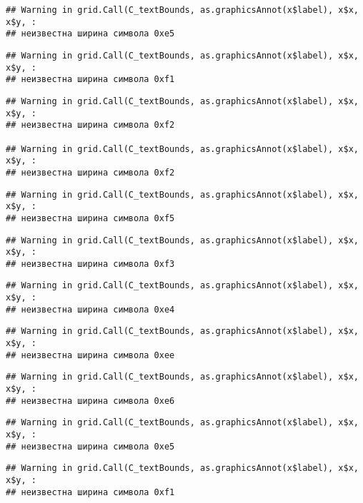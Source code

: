 \documentclass[
]{article}
\begin{document}
\begin{verbatim}
## Warning in grid.Call(C_textBounds, as.graphicsAnnot(x$label), x$x, x$y, :
## неизвестна ширина символа 0xe5
\end{verbatim}

\begin{verbatim}
## Warning in grid.Call(C_textBounds, as.graphicsAnnot(x$label), x$x, x$y, :
## неизвестна ширина символа 0xf1
\end{verbatim}

\begin{verbatim}
## Warning in grid.Call(C_textBounds, as.graphicsAnnot(x$label), x$x, x$y, :
## неизвестна ширина символа 0xf2

## Warning in grid.Call(C_textBounds, as.graphicsAnnot(x$label), x$x, x$y, :
## неизвестна ширина символа 0xf2
\end{verbatim}

\begin{verbatim}
## Warning in grid.Call(C_textBounds, as.graphicsAnnot(x$label), x$x, x$y, :
## неизвестна ширина символа 0xf5
\end{verbatim}

\begin{verbatim}
## Warning in grid.Call(C_textBounds, as.graphicsAnnot(x$label), x$x, x$y, :
## неизвестна ширина символа 0xf3
\end{verbatim}

\begin{verbatim}
## Warning in grid.Call(C_textBounds, as.graphicsAnnot(x$label), x$x, x$y, :
## неизвестна ширина символа 0xe4
\end{verbatim}

\begin{verbatim}
## Warning in grid.Call(C_textBounds, as.graphicsAnnot(x$label), x$x, x$y, :
## неизвестна ширина символа 0xee
\end{verbatim}

\begin{verbatim}
## Warning in grid.Call(C_textBounds, as.graphicsAnnot(x$label), x$x, x$y, :
## неизвестна ширина символа 0xe6
\end{verbatim}

\begin{verbatim}
## Warning in grid.Call(C_textBounds, as.graphicsAnnot(x$label), x$x, x$y, :
## неизвестна ширина символа 0xe5
\end{verbatim}

\begin{verbatim}
## Warning in grid.Call(C_textBounds, as.graphicsAnnot(x$label), x$x, x$y, :
## неизвестна ширина символа 0xf1
\end{verbatim}
\end{document}
